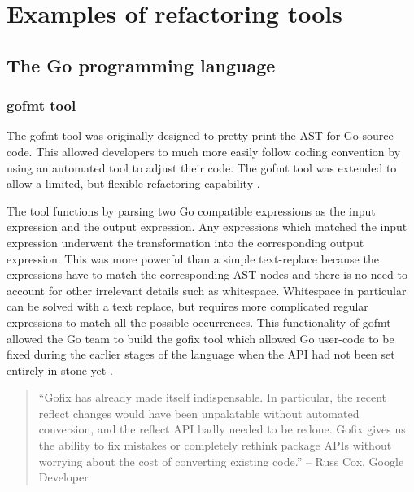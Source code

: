 \section{Examples of refactoring tools}\label{S:exback}
\subsection{The Go programming language}
\subsubsection{gofmt tool}
The gofmt tool was originally designed to pretty-print the AST for Go source code. This allowed developers to much more easily follow coding convention by using an automated tool to adjust their code. The gofmt tool was extended to allow a limited, but flexible refactoring capability \cite{gofmt15}. 

The tool functions by parsing two Go compatible expressions as the input expression and the output expression. Any expressions which matched the input expression underwent the transformation into the corresponding output expression. This was more powerful than a simple text-replace because the expressions have to match the corresponding AST nodes and there is no need to account for other irrelevant details such as whitespace. Whitespace in particular can be solved with a text replace, but requires more complicated regular expressions to match all the possible occurrences. This functionality of gofmt allowed the Go team to build the gofix tool which allowed Go user-code to be fixed during the earlier stages of the language when the API had not been set entirely in stone yet \cite{gofix11}.

\begin{quote}
``Gofix has already made itself indispensable. In particular, the recent reflect changes would have been unpalatable without automated conversion, and the reflect API badly needed to be redone. Gofix gives us the ability to fix mistakes or completely rethink package APIs without worrying about the cost of converting existing code.'' -- Russ Cox, Google Developer \cite{gofix11}
\end{quote}



